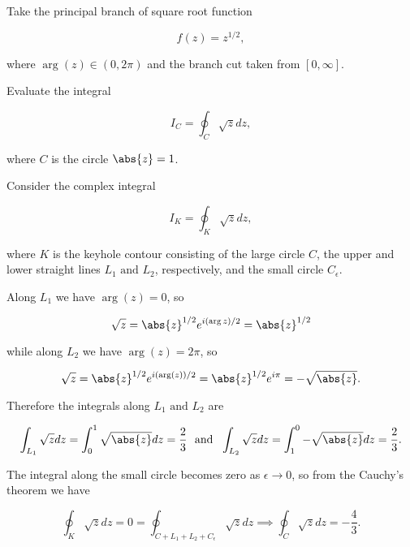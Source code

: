 \documentclass[english,a4paper,12pt]{report}
\begin{document}
{Take the principal branch of square root function 

\begin{equation}
    f(z) = z^{1/2},
\end{equation}

where \(\arg (z) \in (0,2\pi )\) and the branch cut taken from \([0,\infty]\).

Evaluate the integral 

\begin{equation}
    I_{C} = \oint_{C} \sqrt{z}dz,  
\end{equation}

where \(C\) is the circle \(\abs{z} = 1\). 
}
{Consider the complex integral 

\begin{equation}
    I_{K} = \oint_{K} \sqrt{z}dz,  
\end{equation}

where \(K\) is the keyhole contour consisting of the large circle \(C\), the upper and lower straight lines \(L_1 \text { and } L_2 \), respectively, and the small circle \(C_{\epsilon } \). 

Along \(L_1 \) we have \(\arg (z) = 0\), so 

\begin{equation}
    \sqrt{z} = \abs{z}^{1/2}e^{i (\arg z)/2}  = \abs{z}^{1/2}
\end{equation}

while along \(L_2 \) we have \(\arg (z) = 2\pi \), so

\begin{equation}
    \sqrt{z} = \abs{z}^{1/2} e^{i (\arg (z)) /2} = \abs{z}^{1/2} e^{i \pi } = - \sqrt{\abs{z} }.
\end{equation}

Therefore the integrals along \(L_1 \text { and } L_2 \) are 

\begin{equation}
    \int_{L_1 }^{}   \sqrt{z} dz = \int_{0}^{1} \sqrt{\abs{z} } dz  = \frac{2}{3} ~\text { and }~ \int_{L_2 }^{}  \sqrt{z}dz = \int_{1}^{0} -\sqrt{\abs{z} } dz = \frac{2}{3}.  
\end{equation}

The integral along the small circle becomes zero as \(\epsilon \to 0\), so from the Cauchy's theorem we have

\begin{equation}
    \oint_{K} \sqrt{z}dz = 0 = \oint_{C+L_1 +L_2 +C_{\epsilon } } \sqrt{z}dz \implies \oint_{C} \sqrt{z}dz = -\frac{4}{3}.   
\end{equation}

}
\end{document}
